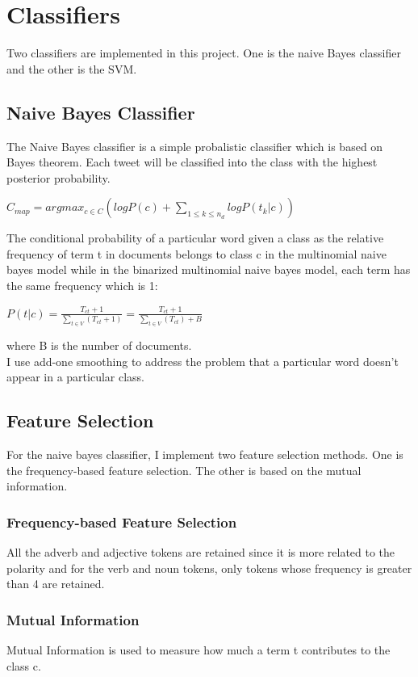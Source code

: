 \documentclass{article}
\begin{document}
\section{Classifiers}
Two classifiers are implemented in this project. One is the naive Bayes classifier and the other is the SVM. 
\subsection{Naive Bayes Classifier}
The Naive Bayes classifier is a simple probalistic classifier which is based on Bayes theorem. Each tweet will be classified into the class with the highest posterior probability.

\begin{center}
$C_{map} = argmax_{c \in C} (log P(c) + \sum_{1 \le k \le n_d} log P(t_k |c))$ 
\end{center}

\noindent The conditional probability of a particular word given a class as the relative frequency of term t in documents belongs to class c in the multinomial naive bayes model while in the binarized multinomial naive bayes model, each term has the same frequency which is 1:

\begin{center}
$P(t|c) = \frac{T_{ct} + 1}{\sum_{t \in V}(T_{ct} + 1)} = \frac{T_{ct} + 1}{\sum_{t \in V}(T_{ct}) + B}$
\end{center}

\noindent where B is the number of documents. \\
I use add-one smoothing to address the problem that a particular word doesn't appear in a particular class. \\
\subsection{Feature Selection}
For the naive bayes classifier, I implement two feature selection methods. One is the frequency-based feature selection. The other is based on the mutual information.
\subsubsection{Frequency-based Feature Selection}
All the adverb and adjective tokens are retained since it is more related to the polarity and for the verb and noun tokens, only tokens whose frequency is greater than 4 are retained. 
\subsubsection{Mutual Information}
Mutual Information is used to measure how much a term t contributes to the class c.
\end{document}
